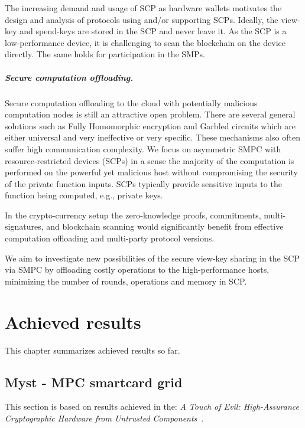 \documentclass[
  digital, %
  twoside, %
  table,   %
  lof,     %
  lot,     %
]{fithesis3}
\theoremstyle{definition}
\theoremstyle{remark}
\begin{document}
\begin{ecmmnt}
The increasing demand and usage of SCP as hardware wallets motivates the design and analysis of protocols using and/or supporting SCPs. Ideally, the view-key and spend-keys are stored in the SCP and never leave it. As the SCP is a low-performance device, it is challenging to scan the blockchain on the device directly. The same holds for participation in the SMPs.

\paragraph{Secure computation offloading.}
Secure computation offloading to the cloud with potentially malicious computation nodes is still an attractive open problem. There are several general solutions such as Fully Homomorphic encryption and Garbled circuits which are either universal and very ineffective or very specific. These mechanisms also often suffer high communication complexity. 
We focus on asymmetric SMPC with resource-restricted devices (SCPs) in a sense the majority of the computation is performed on the powerful yet malicious host without compromising the security of the private function inputs. SCPs typically provide sensitive inputs to the function being computed, e.g., private keys. 

In the crypto-currency setup the zero-knowledge proofs, commitments, multi-signatures, and blockchain scanning would significantly benefit from effective computation offloading and multi-party protocol versions.

We aim to investigate new possibilities of the secure view-key sharing in the SCP via SMPC by offloading costly operations to the high-performance hosts, minimizing the number of rounds, operations and memory in SCP.
\end{ecmmnt}


\chapter{Achieved results}
This chapter summarizes achieved results so far.

% 

\section{Myst - MPC smartcard grid}\label{sec:res:myst}
This section is based on results achieved in the: \emph{A Touch of Evil: High-Assurance Cryptographic Hardware from Untrusted Components}~\cite{2017-ccs-mavroudis}. 
\end{document}
